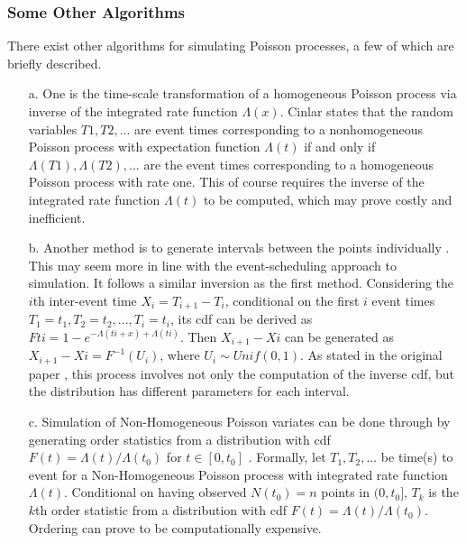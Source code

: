\documentclass[%
 reprint,
 amsmath,amssymb,
 aps,
]{revtex4-2}
\theoremstyle{definition}
\begin{document}
\subsubsection{Some Other Algorithms}
There exist other algorithms for simulating Poisson processes, a few of which are briefly described.
\begin{enumerate}
\item[a.] One is the time-scale transformation of a homogeneous Poisson process via inverse of the integrated rate function $\Lambda(x)$. Cinlar \cite{cinlar1975introduction} states that the random variables $T1, T2, . . .$ are event times corresponding to a nonhomogeneous Poisson process with expectation function $\Lambda(t)$ if and only if $\Lambda(T1),\Lambda(T2), . . .$ are the event times corresponding to a homogeneous Poisson process with rate one. This of course requires the inverse of the integrated rate function $\Lambda(t)$ to be computed, which may prove costly and inefficient.

\item[b.] Another method is to generate intervals between the points individually \cite{pasupathy}. This may seem more in line with the event-scheduling approach to simulation. It follows a similar inversion as the first method. Considering the $i$th inter-event time $X_i = T_{i+1} - T_i$, conditional on the first $i$ event times $T_1 = t_1, T_2 = t_2, . . . , T_i = t_i$, its cdf can be derived as $Fti = 1 - e^{-\Lambda(ti + x) + \Lambda(ti)}$. Then $X_{i+1} - X{i}$ can be generated as $X_{i+1} - X{i} = F^{-1}(U_i)$, where $U_i \sim Unif(0,1)$. As stated in the original paper \cite{lewis_shedler_1979}, this process involves not only the computation of the inverse cdf, but the distribution has different parameters for each interval.

\item[c.] Simulation of Non-Homogeneous Poisson variates can be done through by generating order statistics from a distribution with cdf $F(t) = \Lambda(t)/\Lambda(t_0)$ for $t\in [0,t_0]$ \cite{lewis_shedler_1976}. Formally, let $T_1 , T_2 , ...$ be time(s) to event for a Non-Homogeneous Poisson process with integrated rate function $\Lambda(t)$. Conditional on having observed $N(t_0) = n$ points in $(0,t_0]$, $T_k$ is the $k$th order statistic from a distribution with cdf $F(t) = \Lambda(t) / \Lambda(t_0)$. Ordering can prove to be computationally expensive.
\end{enumerate}
\end{document}
